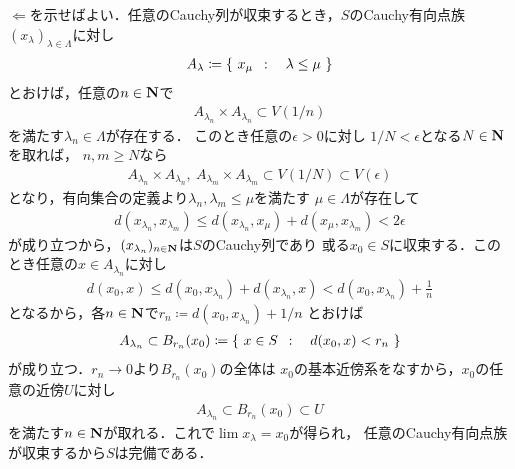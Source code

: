 	\begin{prf}
		$\Longleftarrow$を示せばよい．任意のCauchy列が収束するとき，$S$のCauchy有向点族
		$(x_\lambda)_{\lambda \in \Lambda}$に対し
		\begin{align}
			A_\lambda \coloneqq \left\{\ x_\mu\ \, : \quad \lambda \leq \mu\ \right\}
		\end{align}
		とおけば，任意の$n \in \mathbf{N}$で
		\begin{align}
			A_{\lambda_n} \times A_{\lambda_n} \subset V(1/n)
		\end{align}
		を満たす$\lambda_n \in \Lambda$が存在する．
		このとき任意の$\epsilon > 0$に対し
		$1/N < \epsilon$となる$N \in \mathbf{N}$を取れば，
		$n,m \geq N$なら
		\begin{align}
			A_{\lambda_n} \times A_{\lambda_n},\
			A_{\lambda_m} \times A_{\lambda_m}
			\subset V(1/N) \subset V(\epsilon)
		\end{align}
		となり，有向集合の定義より$\lambda_n,\lambda_m \leq \mu$を満たす
		$\mu \in \Lambda$が存在して
		\begin{align}
			d(x_{\lambda_n},x_{\lambda_m})
			\leq d(x_{\lambda_n},x_\mu) + d(x_\mu,x_{\lambda_m})
			< 2\epsilon
		\end{align}
		が成り立つから，$(x_{\lambda_n})_{n \in \mathbf{N}}$は$S$のCauchy列であり
		或る$x_0 \in S$に収束する．このとき任意の$x \in A_{\lambda_n}$に対し
		\begin{align}
			d(x_0,x) \leq d(x_0,x_{\lambda_n}) + d(x_{\lambda_n},x)
			< d(x_0,x_{\lambda_n}) + \frac{1}{n}
		\end{align}
		となるから，各$n \in \mathbf{N}$で$r_n \coloneqq d(x_0,x_{\lambda_n}) + 1/n$
		とおけば
		\begin{align}
			A_{\lambda_n} \subset B_{r_n}(x_0)
			\coloneqq \left\{\ x \in S\ \, : \quad d(x_0,x) < r_n\ \right\}
		\end{align}
		が成り立つ．$r_n \longrightarrow 0$より$B_{r_n}(x_0)$の全体は
		$x_0$の基本近傍系をなすから，$x_0$の任意の近傍$U$に対し
		\begin{align}
			A_{\lambda_n} \subset B_{r_n}(x_0) \subset U
		\end{align}
		を満たす$n \in \mathbf{N}$が取れる．これで$\lim x_\lambda = x_0$が得られ，
		任意のCauchy有向点族が収束するから$S$は完備である．
		\QED
	\end{prf}